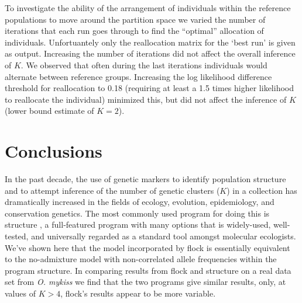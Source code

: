 
To investigate the ability of the arrangement of individuals within the reference 
populations to move around the partition space we varied the number of iterations that 
each run goes through to find the ``optimal'' allocation of individuals. Unfortuantely 
only the reallocation matrix for the `best run' is given as output. Increasing the 
number of iterations did not affect the overall inference of $K$. We 
observed that often during the last iterations individuals would alternate between 
reference groups. Increasing the log likelihood 
difference threshold for reallocation to 0.18 (requiring at least a 1.5 times 
higher likelihood to reallocate the individual) minimized this, but did not affect the 
inference of $K$ (lower bound estimate of $K = 2$).

\section*{Conclusions}
In the past decade, the use of genetic markers to identify population structure and to attempt inference of
the number of genetic clusters ($K$) in a collection has dramatically increased in the fields of ecology, evolution, 
epidemiology, and conservation
genetics. The most commonly used program for doing this is {\sc structure} \citep{Pritchardetal2000,Falushetal2003}, 
a full-featured program with many options that is widely-used, well-tested, and universally regarded as a standard tool amongst molecular ecologists. 
We've shown here that the model incorporated by {\sc flock} is essentially equivalent to the no-admixture model with non-correlated allele frequencies within the program {\sc structure}. In comparing results from {\sc flock} and {\sc structure} 
on a real data set from {\em O. mykiss} we find that the two programs give similar results, only, at values of
$K>4$, {\sc flock}'s results appear to be more variable.

